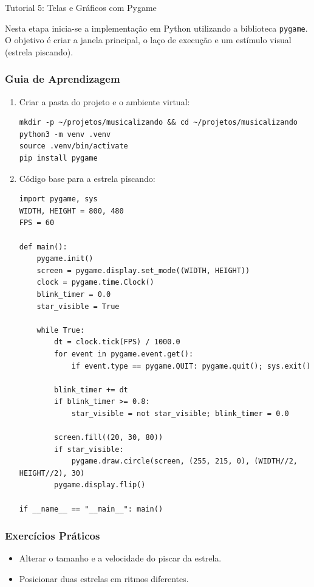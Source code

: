\documentclass[11pt,a4paper]{article}
\begin{document}
\newpage
\begin{boxTutorial}{Tutorial 5: Telas e Gráficos com Pygame}
\label{sec:tutorial5}

    Nesta etapa inicia-se a implementação em Python utilizando a biblioteca \texttt{pygame}. O objetivo é criar a janela principal, o laço de execução e um estímulo visual (estrela piscando).
    
    \subsubsection*{Guia de Aprendizagem}
    \begin{enumerate}
        \item Criar a pasta do projeto e o ambiente virtual:
    \begin{verbatim}
mkdir -p ~/projetos/musicalizando && cd ~/projetos/musicalizando
python3 -m venv .venv
source .venv/bin/activate
pip install pygame
    \end{verbatim}
    
        \item Código base para a estrela piscando:
    \begin{verbatim}
import pygame, sys
WIDTH, HEIGHT = 800, 480
FPS = 60

def main():
    pygame.init()
    screen = pygame.display.set_mode((WIDTH, HEIGHT))
    clock = pygame.time.Clock()
    blink_timer = 0.0
    star_visible = True

    while True:
        dt = clock.tick(FPS) / 1000.0
        for event in pygame.event.get():
            if event.type == pygame.QUIT: pygame.quit(); sys.exit()

        blink_timer += dt
        if blink_timer >= 0.8:
            star_visible = not star_visible; blink_timer = 0.0

        screen.fill((20, 30, 80))
        if star_visible:
            pygame.draw.circle(screen, (255, 215, 0), (WIDTH//2, HEIGHT//2), 30)
        pygame.display.flip()

if __name__ == "__main__": main()
    \end{verbatim}
    \end{enumerate}
    
    \subsubsection*{Exercícios Práticos}
    \begin{itemize}
        \item Alterar o tamanho e a velocidade do piscar da estrela.
        \item Posicionar duas estrelas em ritmos diferentes.
    \end{itemize}
\end{boxTutorial}
\end{document}
